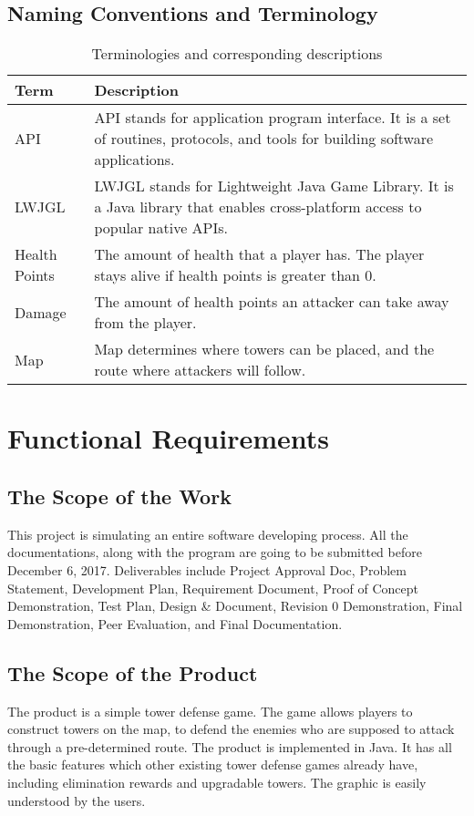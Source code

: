 \documentclass[12pt]{article}
\begin{document}
\subsection{Naming Conventions and Terminology}

\begin{table}[h!]
\centering
\begin{tabular}{ | m{5em} | m{10cm}|} 
\hline
Term & Description \\ 
\hline
API & API stands for application program interface. It is a set of routines, protocols, and tools for building software applications. \\ 
\hline
LWJGL & LWJGL stands for Lightweight Java Game Library. It is a Java library that enables cross-platform access to popular native APIs. \\ 
\hline
Health Points & The amount of health that a player has. The player stays alive if health points is greater than 0. \\ 
\hline
Damage & The amount of health points an attacker can take away from the player. \\ 
\hline
Map & Map determines where towers can be placed, and the route where attackers will follow.  \\
\hline
\end{tabular}
\caption{Terminologies and corresponding descriptions}
\label{table:1}
\end{table}


\section{Functional Requirements}
\subsection{The Scope of the Work}
This project is simulating an entire software developing process. All the documentations, along with the program are going to be submitted before December 6, 2017. Deliverables include Project Approval Doc, Problem Statement, Development Plan, Requirement Document, Proof of Concept Demonstration, Test Plan, Design \& Document,  Revision 0 Demonstration, Final Demonstration, Peer Evaluation, and Final Documentation.

\subsection{The Scope of the Product}
The product is a simple tower defense game. The game allows players to construct towers on the map, to defend the enemies who are supposed to attack through a pre-determined route. The product is implemented in Java. It has all the basic features which other existing tower defense games already have, including elimination rewards and upgradable towers. The graphic is easily understood by the users. 
\end{document}
